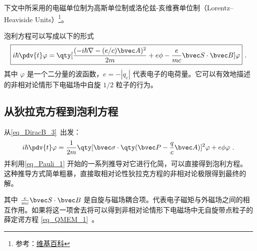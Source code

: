 

下文中所采用的电磁单位制为高斯单位制或洛伦兹-亥维赛单位制（Lorentz–Heaviside Units）\footnote{参考：\href{https://en.wikipedia.org/wiki/Heaviside\%E2\%80\%93Lorentz_units}{维基百科}}。

泡利方程可以写成以下的形式
\begin{equation}
\boxed{
i\hbar\pdv{t} \varphi = \qty[\frac{(-i\hbar\nabla - (e/c)\bvec A)^2}{2m}+e\phi-\frac{e}{mc}\bvec S\cdot \bvec B]\varphi}~.
\end{equation}
其中 $\varphi$ 是一个二分量的波函数，$e=-|q_e|$ 代表电子的电荷量。它可以有效地描述的非相对论情形下电磁场中自旋 $1/2$ 粒子的行为。
\subsection{从狄拉克方程到泡利方程}
从\autoref{eq_DiracB_3}~出发：
\begin{equation}
i\hbar\pdv{t} \varphi = \frac{1}{2m}\qty[\bvec \sigma \cdot\qty(\bvec P - \frac{q}{c}\bvec A)]^2 \varphi + e\phi  \varphi~.
\end{equation}
并利用\autoref{eq_Pauli_1} 开始的一系列推导对它进行化简，可以直接得到泡利方程。这种推导方式简单粗暴，直接取相对论性狄拉克方程的非相对论极限得到最终的解。

其中 $\frac{e}{mc} \bvec S\cdot \bvec B$ 是自旋与磁场耦合项。代表电子磁矩与外磁场之间的相互作用。如果将这一项舍去将可以得到非相对论情形下电磁场中无自旋带点粒子的薛定谔方程 \autoref{eq_QMEM_1}~。
